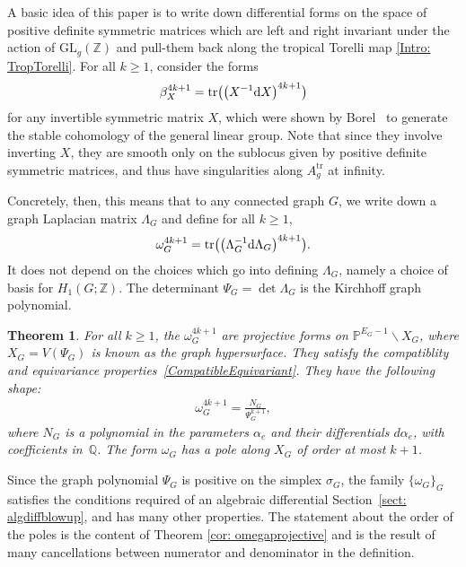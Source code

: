 \documentclass[pdftex]{sigma}%
\newtheorem{thm}{Theorem}[section]
\numberwithin{equation}{section}
\newcommand{\Z}{\mathbb Z}
\newcommand{\Q}{\mathbb Q}
\newcommand{\Pro}{\mathbb P}
\newcommand{\tr}{\mathrm{tr}}
\newcommand{\GL}{\mathrm{GL}}
\newcommand{\0}{\color{blue}{\mathsf{0}}}
\begin{document}
 A basic idea of this paper is to write down differential forms on the space of positive definite symmetric matrices which are left and right invariant under the action of $\GL_g(\Z)$ and pull-them back along the tropical Torelli map \eqref{Intro: TropTorelli}. For all $k\geq 1$, consider the forms
 \begin{gather*}
 \beta_X^{4k+1} = \tr \big(\big(X^{-1} {\rm d}X\big)^{4k+1}\big)
 \end{gather*}
 for any invertible symmetric matrix $X$, which were shown by Borel~\cite{Borel} to generate the stable cohomology of the general linear group.
 Note that since they involve inverting $X$, they are smooth only on the sublocus given by positive definite symmetric matrices, and thus have singularities along $A_g^{\mathrm{tr}}$ at infinity.

 Concretely, then, this means that to any connected graph $G$, we write down a graph Laplacian matrix $\Lambda_G$ and define for all $k\geq 1$,
 \begin{gather} \label{omegacan}
 \omega^{4k+1}_G = \tr \big(\big(\Lambda_G^{-1} {\rm d} \Lambda_G\big)^{4k+1}\big).
 \end{gather}
It does not depend on the choices which go into defining $\Lambda_G$, namely a choice of basis for $H_1(G;\Z)$.
 The determinant $\Psi_G = \det \Lambda_G$ is the Kirchhoff graph polynomial.

\begin{thm} For all $k\geq 1$, the $\omega^{4k+1}_G$ are projective forms on
$\Pro^{E_G-1} \backslash X_G$,
where $X_G = V(\Psi_G)$ is known as the graph hypersurface. They satisfy the compatiblity and equivariance properties~\eqref{CompatibleEquivariant}.
They have the following shape:
\begin{gather} \label{intro: omegashape}
\omega^{4k+1}_G = \frac{N_G}{\Psi^{k+1}_G},
\end{gather}
where $N_G$ is a polynomial in the parameters $\alpha_e$ and their differentials $d
\alpha_e$, with coefficients in~$\Q$. The form $\omega_G$ has a pole along $X_G$ of order at most $k+1$.
\end{thm}

Since the graph polynomial $\Psi_G$ is positive on the simplex $\sigma_G$, the family $\{\omega_G\}_G$ satisfies the conditions required of an algebraic differential Section~\ref{sect: algdiffblowup}, and has many other properties. The statement about the order of the poles is the content of Theorem \ref{cor: omegaprojective} and is the result of many cancellations between numerator and denominator in the definition.
\end{document}
